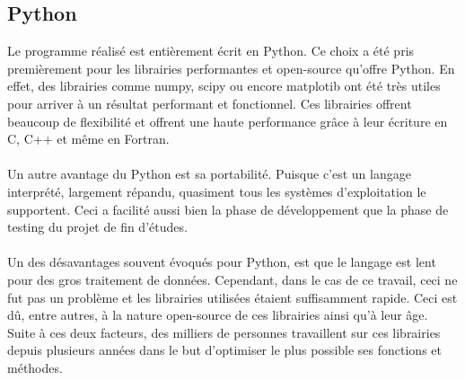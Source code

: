 \documentclass[11pt]{article}
\begin{document}
\subsection{Python}

Le programme réalisé est entièrement écrit en Python.
Ce choix a été pris premièrement pour les librairies performantes et open-source qu'offre Python.
En effet, des librairies comme numpy, scipy ou encore matplotib ont été très utiles pour arriver à un résultat performant et fonctionnel.
Ces librairies offrent beaucoup de flexibilité et offrent une haute performance grâce à leur écriture en C, C++ et même en Fortran.\\
\\
Un autre avantage du Python est sa portabilité.
Puisque c'est un langage interprété, largement répandu, quasiment tous les systèmes d'exploitation le supportent.
Ceci a facilité aussi bien la phase de développement que la phase de testing du projet de fin d'études.\\
\\
Un des désavantages souvent évoqués pour Python, est que le langage est lent pour des gros traitement de données.
Cependant, dans le cas de ce travail, ceci ne fut pas un problème et les librairies utilisées étaient suffisamment rapide.
Ceci est dû, entre autres, à la nature open-source de ces librairies ainsi qu'à leur âge.
Suite à ces deux facteurs, des milliers de personnes travaillent sur ces librairies depuis plusieurs années dans le but d'optimiser le plus possible ses fonctions et méthodes.

\end{document}
